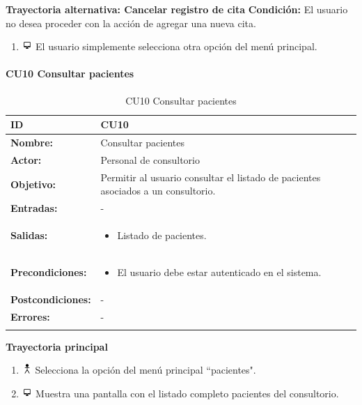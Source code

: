 \textbf{Trayectoria alternativa: Cancelar registro de cita} \bigskip
\vspace{0.3em}
\textbf{Condición:} El usuario no desea proceder con la acción de agregar una nueva cita.
\begin{enumerate}
\item \includegraphics[height=1em]{pictures/sistema.png} El usuario simplemente selecciona otra opción del menú principal.
\end{enumerate} \bigskip


\paragraph{CU10 Consultar pacientes}

\begin{longtable}[H]{|p{}|p{12cm}|}
\hline\textbf{ID}         
& \textbf{CU10}            \\ \hline
\textbf{Nombre:}          
& Consultar pacientes      \\ \hline
\textbf{Actor:}          
& Personal de consultorio   \\ \hline
\textbf{Objetivo:}       
& Permitir al usuario consultar el listado de pacientes asociados a  un consultorio.\\ \hline
\textbf{Entradas:}  &   -
\\ \hline
\textbf{Salidas:}  &             
\begin{itemize}[nosep]
\item Listado de pacientes.
\end{itemize}
\\ \hline
\textbf{Precondiciones:}  &             
\begin{itemize}[nosep]
\item El usuario debe estar autenticado en el sistema.
\end{itemize}
\\ \hline
\textbf{Postcondiciones:} &  -
\\ \hline 
\textbf{Errores:} &  -
\\ \hline
\caption{CU10 Consultar pacientes}
\label{table:1}
\end{longtable}

\textbf{Trayectoria principal}
\begin{enumerate}
\item \includegraphics[height=1em]{pictures/actor.png} Selecciona la opción del menú principal ``pacientes".
\item \includegraphics[height=1em]{pictures/sistema.png} Muestra una pantalla con el listado completo pacientes del consultorio.
\end{enumerate} \bigskip

